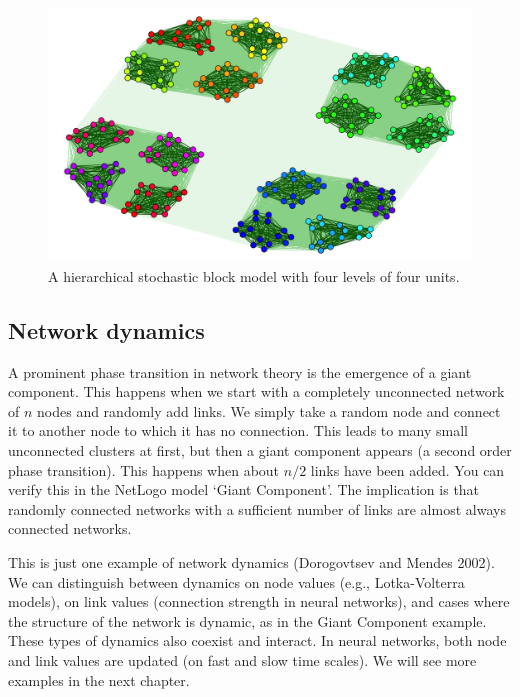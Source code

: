 \documentclass[
  a4paper,
  DIV=11,
  numbers=noendperiod,
  oneside]{scrreprt}
\begin{document}
\begin{figure}

{\centering \includegraphics{media/ch6/fig-ch6-extra.png}

}

\caption{\label{fig-ch6-extra}A hierarchical stochastic block model with
four levels of four units.}

\end{figure}

\hypertarget{sec-Network-dynamics}{%
\subsection{Network dynamics}\label{sec-Network-dynamics}}

A prominent phase transition in network theory is the emergence of a
giant component. This happens when we start with a completely
unconnected network of \(n\) nodes and randomly add links. We simply
take a random node and connect it to another node to which it has no
connection. This leads to many small unconnected clusters at first, but
then a giant component appears (a second order phase transition). This
happens when about \(n/2\) links have been added. You can verify this in
the NetLogo model `Giant Component'. The implication is that randomly
connected networks with a sufficient number of links are almost always
connected networks.

This is just one example of network dynamics (Dorogovtsev and Mendes
2002). We can distinguish between dynamics on node values (e.g.,
Lotka-Volterra models), on link values (connection strength in neural
networks), and cases where the structure of the network is dynamic, as
in the Giant Component example. These types of dynamics also coexist and
interact. In neural networks, both node and link values are updated (on
fast and slow time scales). We will see more examples in the next
chapter.
\end{document}
